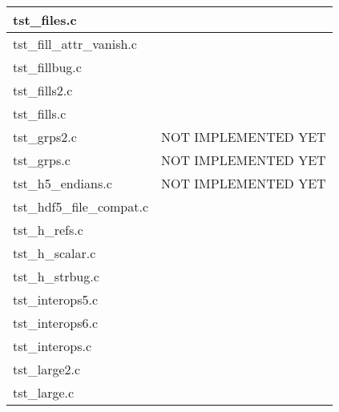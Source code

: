 \begin{table}[H]
\begin{tabular}{|l|l|}
tst\_files.c   &       \\ \hline
tst\_fill\_attr\_vanish.c   &       \\ \hline
tst\_fillbug.c   &       \\ \hline
tst\_fills2.c   &       \\ \hline
tst\_fills.c   &       \\ \hline
tst\_grps2.c   &   NOT IMPLEMENTED YET    \\ \hline
tst\_grps.c   &    NOT IMPLEMENTED YET   \\ \hline
tst\_h5\_endians.c   &   NOT IMPLEMENTED YET    \\ \hline
tst\_hdf5\_file\_compat.c   &       \\ \hline
tst\_h\_refs.c   &       \\ \hline
tst\_h\_scalar.c   &       \\ \hline
tst\_h\_strbug.c   &       \\ \hline
tst\_interops5.c   &       \\ \hline
tst\_interops6.c   &       \\ \hline
tst\_interops.c   &       \\ \hline
tst\_large2.c   &       \\ \hline
tst\_large.c   &       \\ \hline
\end{tabular}
\caption{}
\end{table}

\clearpage

